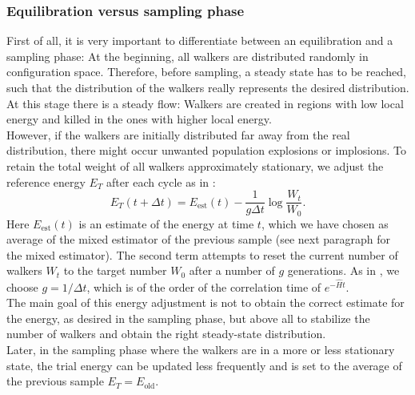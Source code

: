 \subsubsection{Equilibration versus sampling phase}
First of all, it is very important to differentiate between an equilibration and a sampling phase: At the beginning, all walkers are distributed randomly in configuration space. Therefore, before sampling, a steady state has to be reached, such that the distribution of the walkers really represents the desired distribution. At this stage there is a steady flow: Walkers are created in regions with low local energy and killed in the ones with higher local energy.\\
 However, if the walkers are initially distributed far away from the real distribution, there might occur unwanted population explosions or implosions. To retain the total weight of all walkers approximately stationary, we adjust the reference energy $E_T$ after each cycle as in \cite{PhysRev991}:
\[
E_T(t+\Delta t) = E_{\text{est}}(t) - \frac{1}{g\Delta t}\log\frac{W_t}{W_0}.
\]
Here $E_{\text{est}}(t)$ is an estimate of the energy at time $t$, which we have chosen as average of the mixed estimator of the previous sample (see next paragraph for the mixed estimator). The second term attempts to reset the current number of walkers $W_t$ to the target number $W_0$ after a number of $g$ generations. As in \cite{PhysRev991}, we choose $g = 1/\Delta t$, which is of the order of the correlation time of $e^{-\hat{H}t}$. \\
The main goal of this energy adjustment is not to obtain the correct estimate for the energy, as desired in the sampling phase, but above all to stabilize the number of walkers and obtain the right steady-state distribution.\\
Later, in the sampling phase where the walkers are in a more or less stationary state, the trial energy can be updated less frequently and is set to the average of the previous sample $E_T = E_{\text{old}}$. 

